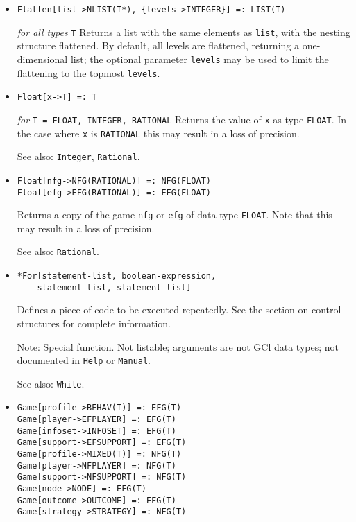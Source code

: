 \begin{itemize}
\item
\protect \large \begin{verbatim}
Flatten[list->NLIST(T*), {levels->INTEGER}] =: LIST(T)
\end{verbatim} \normalsize

{\it for all types} {\tt T}
\bd
Returns a list with the same elements as \verb+list+, with the nesting
structure flattened.  By default, all levels are flattened, returning
a one-dimensional list; the optional parameter \verb+levels+ may be
used to limit the flattening to the topmost \verb+levels+.
\ed

\item
\protect \large \begin{verbatim}
Float[x->T] =: T
\end{verbatim} \normalsize

{\it for} {\tt T = FLOAT, INTEGER, RATIONAL}
\bd
Returns the value of \verb+x+ as type \verb+FLOAT+.
In the case where \verb+x+ is \verb+RATIONAL+ this may result in a loss
of precision.
\item [See also:] \verb+Integer+, \verb+Rational+.
\ed

\item
\protect \large \begin{verbatim}
Float[nfg->NFG(RATIONAL)] =: NFG(FLOAT)
Float[efg->EFG(RATIONAL)] =: EFG(FLOAT)
\end{verbatim} \normalsize

\bd
Returns a copy of the game \verb+nfg+ or \verb+efg+ of data type 
\verb+FLOAT+. Note that this may result in a loss of precision.  
\item [See also:] \verb+Rational+.
\ed

\item
\protect \large \begin{verbatim}
*For[statement-list, boolean-expression, 
    statement-list, statement-list]
\end{verbatim}\normalsize

\bd
Defines a piece of code to be executed repeatedly.  See the section
on control structures for complete information.
\item [Note:] Special function.  Not listable; arguments are not GCl
data types; not documented in \verb+Help+ or \verb+Manual+.  
\item
[See also:] \verb+While+.
\ed


\item
\protect \large \begin{verbatim}
Game[profile->BEHAV(T)] =: EFG(T)
Game[player->EFPLAYER] =: EFG(T)
Game[infoset->INFOSET] =: EFG(T)
Game[support->EFSUPPORT] =: EFG(T)
Game[profile->MIXED(T)] =: NFG(T)
Game[player->NFPLAYER] =: NFG(T)
Game[support->NFSUPPORT] =: NFG(T)
Game[node->NODE] =: EFG(T)
Game[outcome->OUTCOME] =: EFG(T)
Game[strategy->STRATEGY] =: NFG(T)
\end{verbatim} \normalsize


\end{itemize}
